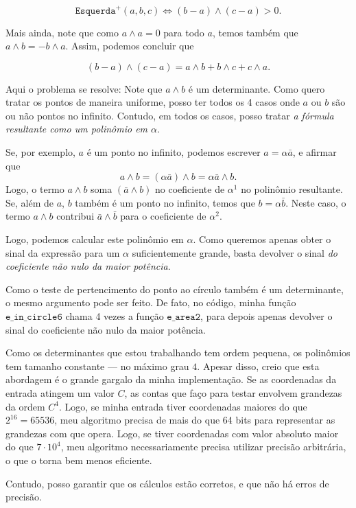 \documentclass[10pt,reqno,a4paper]{article}
\begin{document}
\[\texttt{Esquerda}^+(a,b,c) \iff (b - a) \wedge (c - a) > 0.\]

Mais ainda, note que como $a \wedge a = 0$ para todo $a$, temos também
que $a \wedge b = - b \wedge a$. Assim, podemos concluir que

\[(b - a) \wedge (c - a) = a \wedge b + b \wedge c + c \wedge a.\]

Aqui o problema se resolve: Note que $a \wedge b$ é um determinante. Como
quero tratar os pontos de maneira uniforme, posso ter todos os 4 casos onde
$a$ ou $b$ são ou não pontos no infinito. Contudo, em todos os casos,
posso tratar \emph{a fórmula resultante como um polinômio em $\alpha$}.

Se, por exemplo, $a$ é um ponto no infinito, podemos escrever $a = \alpha \bar{a}$,
e afirmar que
\[a \wedge b = (\alpha \bar{a}) \wedge b = \alpha \bar{a} \wedge b.\]
Logo, o termo $a \wedge b$ soma $(\bar{a} \wedge b)$ no coeficiente de $\alpha^1$
no polinômio resultante. Se, além de $a$, $b$ também é um ponto no infinito, temos que
$b = \alpha \bar{b}$. Neste caso, o termo $a \wedge b$ contribui $\bar{a} \wedge \bar{b}$
para o coeficiente de $\alpha^2$.

Logo, podemos calcular este polinômio em $\alpha$. Como queremos apenas obter
o sinal da expressão para um $\alpha$ suficientemente grande, basta devolver
o sinal \emph{do coeficiente não nulo da maior potência}.

Como o teste de pertencimento do ponto ao círculo também é um determinante,
o mesmo argumento pode ser feito. De fato, no código, minha função $\texttt{e\_in\_circle6}$
chama 4 vezes a função $\texttt{e\_area2}$, para depois apenas devolver o
sinal do coeficiente não nulo da maior potência.

Como os determinantes que estou trabalhando tem ordem pequena, os polinômios
tem tamanho constante --- no máximo grau $4$. Apesar disso, creio que esta
abordagem é o grande gargalo da minha implementação. Se as coordenadas da
entrada atingem um valor $C$, as contas que faço para testar envolvem grandezas
da ordem $C^4$. Logo, se minha entrada tiver coordenadas maiores do que
$2^{16} = 65536$, meu algoritmo precisa de mais do que 64 bits para representar
as grandezas com que opera. Logo, se tiver coordenadas com valor absoluto maior do que
$7 \cdot 10^4$, meu algoritmo necessariamente precisa utilizar precisão arbitrária,
o que o torna bem menos eficiente.

Contudo, posso garantir que os cálculos estão corretos, e que não há erros
de precisão.
\end{document}
